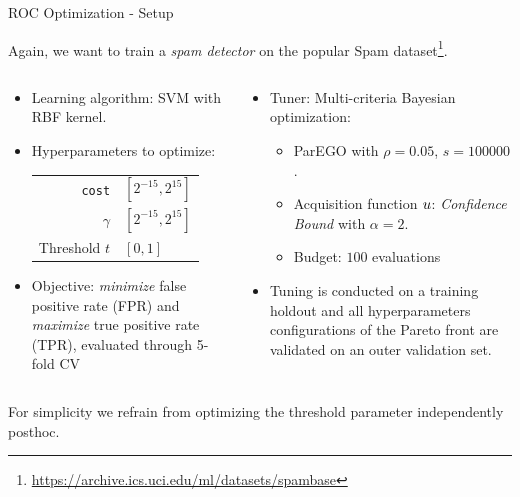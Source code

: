 \begin{frame}{ROC Optimization - Setup}

  Again, we want to train a \textit{spam detector} on the popular Spam dataset\footnote{\url{https://archive.ics.uci.edu/ml/datasets/spambase}}.

\begin{columns}
\begin{column}{0.5\textwidth}
\begin{itemize}
        \item Learning algorithm: SVM with RBF kernel.
        \item Hyperparameters to optimize: \\
        \begin{tabular}{rl}
        \texttt{cost} & $[2^{-15}, 2^{15}]$ \\
        $\gamma$ & $[2^{-15}, 2^{15}]$ \\
        Threshold $t$ & $[0,1]$ \\
        \end{tabular}
        \item Objective: \emph{minimize} false positive rate (FPR) and \emph{maximize} true positive rate (TPR), evaluated through 5-fold CV
\end{itemize}
\end{column}%
\begin{column}{0.5\textwidth}
\begin{itemize}    
        \item Tuner: Multi-criteria Bayesian optimization:
            \begin{itemize}
              \item ParEGO with $\rho = 0.05$, $s = 100000$.
              \item Acquisition function $u$: \emph{Confidence Bound} with $\alpha = 2$. 
              \item Budget: $100$ evaluations
            \end{itemize}
        \item Tuning is conducted on a training holdout and all hyperparameters configurations of the Pareto front are validated on an outer validation set.
\end{itemize}
\end{column}
\end{columns}
\vspace{0.5cm}
{\footnotesize For simplicity we refrain from optimizing the threshold parameter independently posthoc.}
\end{frame}

